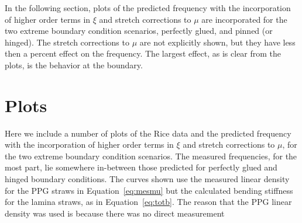 \documentclass[twoside]{article}
\begin{document}
\begin{multicols}{2}
In the following section, plots of the predicted frequency with the incorporation of higher order terms in $\xi$ and stretch corrections to $\mu$ are incorporated for the two extreme boundary condition scenarios, perfectly glued, and pinned (or hinged).  The stretch corrections to $\mu$ are not explicitly shown, but they have less then a percent effect on the frequency. The largest effect, as is clear from the plots, is the behavior at the boundary.



\section{Plots}
Here we include a number of plots of the Rice data and the predicted frequency  with the incorporation of higher order terms in $\xi$ and stretch corrections to $\mu$, for the two extreme boundary condition scenarios.  The measured frequencies, for the most part, lie somewhere in-between those predicted for perfectly glued and hinged boundary conditions. The curves shown use the measured linear density for the PPG straws in Equation~\ref{eq:mesmu} but the calculated bending stiffness for the lamina straws, as in Equation~\ref{eq:totb}.  The reason that the PPG linear density was used is because there was no direct measurement 



\end{multicols}
\end{document}
